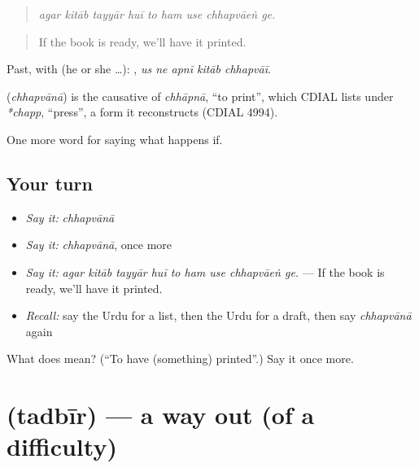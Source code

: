 \begin{quote}
        
\end{quote}

\begin{quote}
\emph{agar kitāb tayyār huī to ham use chhapvāeṅ ge.}
\end{quote}

\begin{quote}
If the book is ready, we'll have it printed.
\end{quote}

Past, with  (he or she …):     , \emph{us ne apnī kitāb chhapvāī}.

\begin{cousinweb}
\textbf{} (\emph{chhapvānā}) is the causative of \emph{chhāpnā}, \textquotedblleft{}to print\textquotedblright{}, which CDIAL lists under \emph{*chapp}, \textquotedblleft{}press\textquotedblright{}, a form it reconstructs (CDIAL 4994).
\end{cousinweb}

\begin{grammarlens}[title={What you've built}]
One more word for saying what happens if.
\end{grammarlens}

\subsection*{Your turn}
\begin{itemize}
\raggedright
  \item \emph{Say it:} \emph{chhapvānā}
  \item \emph{Say it:} \emph{chhapvānā}, once more
  \item \emph{Say it:} \emph{agar kitāb tayyār huī to ham use chhapvāeṅ ge.} — If the book is ready, we'll have it printed.
  \item \emph{Recall:} say the Urdu for a list, then the Urdu for a draft, then say \emph{chhapvānā} again
\end{itemize}

\begin{tcolorbox}[breakable,colback=teal!4,colframe=teal!35!black,title={Before you move on}]
What does  mean? (\textquotedblleft{}To have (something) printed\textquotedblright{}.) Say it once more.
\end{tcolorbox}
\section[\texorpdfstring{\ur{تدبیر} (tadbīr)}{تدبیر (tadbīr)}]{ (tadbīr) — a way out (of a difficulty)}

